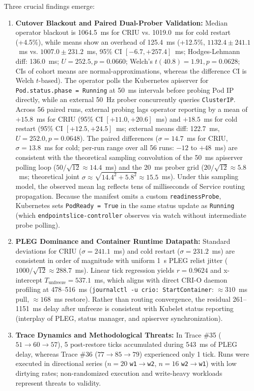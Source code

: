 \documentclass[conference,10pt]{IEEEtran}
\begin{document}
Three crucial findings emerge:
\begin{enumerate}
    \item \textbf{Cutover Blackout and Paired Dual-Prober Validation:} Median operator blackout is 1064.5~ms for CRIU vs. 1019.0~ms for cold restart (+4.5\%), while means show an overhead of 125.4~ms (+12.5\%, $1132.4 \pm 241.1$~ms vs. $1007.0 \pm 231.2$~ms, 95\% CI $[-6.7, +257.4]$~ms; Hodges-Lehmann diff: 136.0~ms; $U = 252.5, p = 0.0660$; Welch's $t(40.8) = 1.91, p = 0.0628$; CIs of cohort means are normal-approximations, whereas the difference CI is Welch $t$-based). The operator polls the Kubernetes apiserver for \texttt{Pod.status.phase = Running} at 50~ms intervals before probing Pod IP directly, while an external 50~Hz prober concurrently queries \texttt{ClusterIP}. Across 56 paired runs, external probing lags operator reporting by a mean of $+15.8$~ms for CRIU (95\% CI $[+11.0, +20.6]$~ms) and $+18.5$~ms for cold restart (95\% CI $[+12.5, +24.5]$~ms; external means diff: 122.7~ms, $U = 252.0, p = 0.0648$). The paired differences ($\sigma = 14.7$~ms for CRIU, $\sigma = 13.8$~ms for cold; per-run range over all 56 runs: $-12$ to $+48$~ms) are consistent with the theoretical sampling convolution of the 50~ms apiserver polling loop ($50/\sqrt{12} \approx 14.4$~ms) and the 20~ms prober grid ($20/\sqrt{12} \approx 5.8$~ms; theoretical joint $\sigma \approx \sqrt{14.4^2 + 5.8^2} \approx 15.5$~ms). Under this sampling model, the observed mean lag reflects tens of milliseconds of Service routing propagation. Because the manifest omits a custom \texttt{readinessProbe}, Kubernetes sets \texttt{PodReady = True} in the same status update as \texttt{Running} (which \texttt{endpointslice-controller} observes via watch without intermediate probe polling).
    \item \textbf{PLEG Dominance and Container Runtime Datapath:} Standard deviations for CRIU ($\sigma = 241.1$~ms) and cold restart ($\sigma = 231.2$~ms) are consistent in order of magnitude with uniform 1~s PLEG relist jitter ($1000 / \sqrt{12} \approx 288.7$~ms). Linear tick regression yields $r = 0.9624$ and x-intercept $T_{\text{unfreeze}} = 537.1$~ms, which aligns with direct CRI-O daemon profiling at 478--516~ms (\texttt{journalctl -u crio: StartContainer}: $\approx 310$~ms pull, $\approx 168$~ms restore). Rather than routing convergence, the residual 261--1151~ms delay after unfreeze is consistent with Kubelet status reporting (interplay of PLEG, status manager, and apiserver synchronization).
    \item \textbf{Trace Dynamics and Methodological Threats:} In Trace \#35 ($51 \to 60 \to 57$), 5 post-restore ticks accumulated during 543~ms of PLEG delay, whereas Trace \#36 ($77 \to 85 \to 79$) experienced only 1 tick. Runs were executed in directional series ($n=20$ \texttt{w1}$\to$\texttt{w2}, $n=16$ \texttt{w2}$\to$\texttt{w1}) with low dirtying rates; non-randomized execution and write-heavy workloads represent threats to validity.
\end{enumerate}
\end{document}
